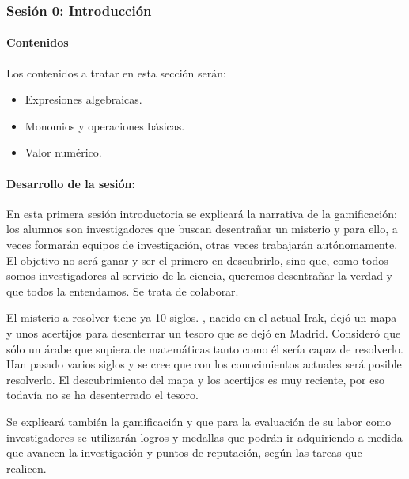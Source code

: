 \subsubsection{Sesión 0: Introducción}


\paragraph{Contenidos}

Los contenidos a tratar en esta sección serán:
\begin{itemize}

\item Expresiones algebraicas.
\item Monomios y operaciones básicas.
\item Valor numérico.
\end{itemize}

\paragraph{Desarrollo de la sesión: }

En esta primera sesión introductoria se explicará la narrativa de la gamificación: 
%
los alumnos son investigadores que buscan desentrañar un misterio y para ello, a veces formarán equipos de investigación, otras veces trabajarán autónomamente.
%
El objetivo no será ganar y ser el primero en descubrirlo, sino que, como todos somos investigadores al servicio de la ciencia, queremos desentrañar la verdad y que todos la entendamos.
%
Se trata de colaborar.

El misterio a resolver tiene ya 10 siglos.
%
\Arab, nacido en el actual Irak, dejó un mapa y unos acertijos para desenterrar un tesoro que se dejó en Madrid.
%
Consideró que sólo un árabe que supiera de matemáticas tanto como él sería capaz de resolverlo.
%
Han pasado varios siglos y se cree que con los conocimientos actuales será posible resolverlo.
%
El descubrimiento del mapa y los acertijos es muy reciente, por eso todavía no se ha desenterrado el tesoro.

Se explicará también la gamificación y que para la evaluación de su labor como investigadores se utilizarán logros y medallas que podrán ir adquiriendo a medida que avancen la investigación y puntos de reputación, según las tareas que realicen.

